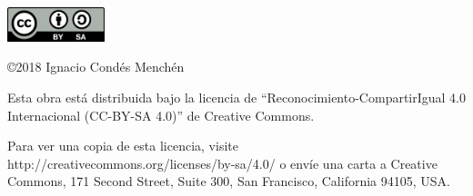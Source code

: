 \begin{flushright}
	\includegraphics[height=1.0cm]{images/CC-BY-SA}
	
	\vspace*{0.5cm}
	
	\copyright 2018 Ignacio Condés Menchén
	
	\vspace*{0.3cm}
	
	Esta obra está distribuida bajo la licencia de ``Reconocimiento-CompartirIgual 4.0 Internacional (CC-BY-SA 4.0)'' de Creative Commons.
	
	\vspace{0.2cm}
	
	Para ver una copia de esta licencia, visite
	http://creativecommons.org/licenses/by-sa/4.0/ o envíe una
	carta a Creative Commons, 171 Second Street, Suite 300,
	San Francisco, California 94105, USA.
\end{flushright}